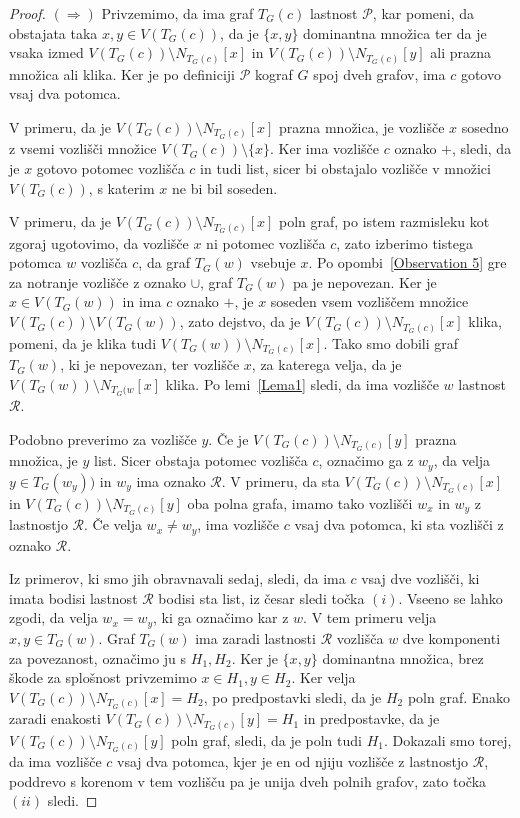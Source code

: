 \documentclass[12pt,a4paper,twoside]{article}
\theoremstyle{definition} %
\theoremstyle{plain} %
\numberwithin{equation}{section}  %
\begin{document}
\begin{proof}
$(\Rightarrow)$ Privzemimo, da ima graf $T_G(c)$ lastnost $\mathcal{P}$, kar pomeni, da obstajata taka $x, y \in V(T_G(c))$, da je $\{x, y\}$ dominantna množica ter da je vsaka izmed $V(T_G(c)) \setminus N_{T_G(c)}[x]$ in $V(T_G(c)) \setminus N_{T_G(c)}[y]$ ali prazna množica ali klika. Ker je po definiciji $\mathcal{P}$ kograf $G$ spoj dveh grafov, ima $c$ gotovo vsaj dva potomca. 

V primeru, da je $V(T_G(c)) \setminus N_{T_G(c)}[x]$ prazna množica, je vozlišče $x$ sosedno z vsemi vozlišči množice $V(T_G(c)) \setminus \{x\}$. Ker ima vozlišče $c$ oznako $+$, sledi, da je $x$ gotovo potomec vozlišča $c$ in tudi list, sicer bi obstajalo vozlišče v množici $V(T_G(c))$, s katerim $x$ ne bi bil soseden.

V primeru, da je $V(T_G(c)) \setminus N_{T_G(c)}[x]$ poln graf, po istem razmisleku kot zgoraj ugotovimo, da vozlišče $x$ ni potomec vozlišča $c$, zato izberimo tistega potomca $w$ vozlišča $c$, da graf $T_G(w)$ vsebuje $x$. Po opombi~\ref{Observation 5} gre za notranje vozlišče z oznako $\cup$, graf $T_G(w)$ pa je nepovezan. Ker je $x \in V(T_G(w))$ in ima $c$ oznako $+$, je $x$ soseden vsem vozliščem množice $V(T_G(c)) \setminus V(T_G(w))$, zato dejstvo, da je $V(T_G(c)) \setminus N_{T_G(c)}[x]$ klika, pomeni, da je klika tudi $V(T_G(w)) \setminus N_{T_G(c)}[x]$. Tako smo dobili graf $T_G(w)$, ki je nepovezan, ter vozlišče $x$, za katerega velja, da je $V(T_G(w)) \setminus N_{T_G(w}[x]$ klika. Po lemi~\ref{Lema1} sledi, da ima vozlišče $w$ lastnost $\mathcal{R}$.

Podobno preverimo za vozlišče $y$. Če je $V(T_G(c)) \setminus N_{T_G(c)}[y]$ prazna množica, je $y$ list. Sicer obstaja potomec vozlišča $c$, označimo ga z $w_y$, da velja $y \in T_G(w_y))$ in $w_y$ ima oznako $\mathcal{R}$. V primeru, da sta  $V(T_G(c)) \setminus N_{T_G(c)}[x]$ in  $V(T_G(c)) \setminus N_{T_G(c)}[y]$ oba polna grafa, imamo tako vozlišči $w_x$ in $w_y$ z lastnostjo $\mathcal{R}$. Če velja $w_x \neq w_y$, ima vozlišče $c$ vsaj dva potomca, ki sta vozlišči z oznako $\mathcal{R}$.

Iz primerov, ki smo jih obravnavali sedaj, sledi, da ima $c$ vsaj dve vozlišči, ki imata bodisi lastnost $\mathcal{R}$ bodisi sta list, iz česar sledi točka $(i)$. Vseeno se lahko zgodi, da velja $w_x=w_y$, ki ga označimo kar z $w$. V tem primeru velja $x, y \in T_G(w)$. Graf $T_G(w)$ ima zaradi lastnosti $\mathcal{R}$ vozlišča $w$ dve komponenti za povezanost, označimo ju s $H_1, H_2$. Ker je $\{x, y\}$ dominantna množica, brez škode za splošnost privzemimo $x \in H_1, y \in H_2$. Ker velja $V(T_G(c)) \setminus N_{T_G(c)}[x] = H_2$, po predpostavki sledi, da je $H_2$ poln graf. Enako zaradi enakosti $V(T_G(c)) \setminus N_{T_G(c)}[y] = H_1$ in predpostavke, da je $V(T_G(c)) \setminus N_{T_G(c)}[y]$ poln graf, sledi, da je poln tudi $H_1$. Dokazali smo torej, da ima vozlišče $c$ vsaj dva potomca, kjer je en od njiju vozlišče z lastnostjo $\mathcal{R}$, poddrevo s korenom v tem vozlišču pa je unija dveh polnih grafov, zato točka $(ii)$ sledi.


\end{proof}
\end{document}
